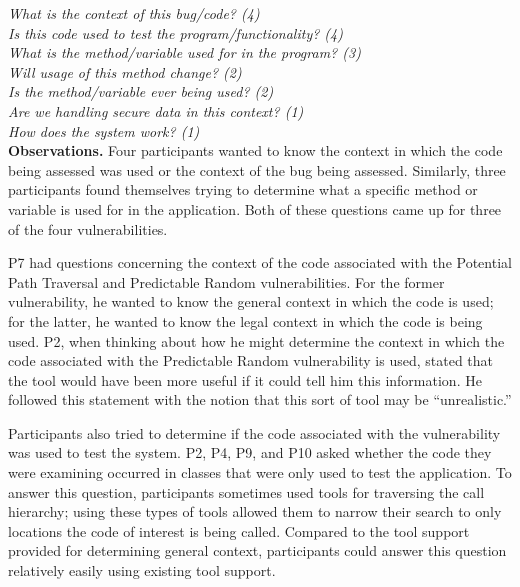 \documentclass[conference]{IEEEtran}
\begin{document}
\noindent\emph{What is the context of this bug/code? (4)} \\
\emph{Is this code used to test the program/functionality? (4)} \\
\emph{What is the method/variable used for in the program? (3)} \\
\emph{Will usage of this method change? (2)} \\
\emph{Is the method/variable ever being used? (2)} \\
\emph{Are we handling secure data in this context? (1)} \\
\emph{How does the system work? (1)} \\



\noindent\textbf{Observations.}
Four participants wanted to know the context in which the code being assessed was used or the context of the bug being assessed.
Similarly, three participants found themselves trying to determine what a specific method or variable is used for in the application.
Both of these questions came up for three of the four vulnerabilities.

 
P7 had questions concerning the context of the code associated with the Potential Path Traversal and Predictable Random vulnerabilities.
For the former vulnerability, he wanted to know the general context in which the code is used; for the latter, he wanted to know the legal context in which the code is being used.
P2, when thinking about how he might determine the context in which the code associated with the Predictable Random vulnerability is used, stated that the tool would have been more useful if it could tell him this information.
He followed this statement with the notion that this sort of tool may be ``unrealistic.'' 

Participants also tried to determine if the code associated with the vulnerability was used to test the system. 
P2, P4, P9, and P10 asked whether the code they were examining occurred in classes that were only used to test the application. 
To answer this question, participants sometimes used tools for traversing the call hierarchy; using these types of tools allowed them to narrow their search to only locations the code of interest is being called.
Compared to the tool support provided for determining general context, participants could answer this question relatively easily using existing tool support.
\\
\end{document}
